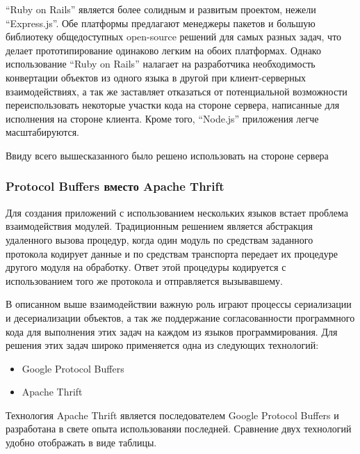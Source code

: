 \documentclass[14pt, a4paper]{extarticle}
\begin{document}
``Ruby on Rails'' является более солидным и развитым проектом, нежели
``Express.js''. Обе платформы предлагают менеджеры пакетов и большую библиотеку
общедоступных open-source решений для самых разных задач, что делает
прототипирование одинаково легким на обоих платформах. Однако использование
``Ruby on Rails'' налагает на разработчика необходимость конвертации объектов из
одного языка в другой при клиент-серверных взаимодействиях, а так же заставляет
отказаться от потенциальной возможности переиспользовать некоторые участки кода
на стороне сервера, написанные для исполнения на стороне клиента. Кроме того,
``Node.js'' приложения легче масштабируются.

Ввиду всего вышесказанного было решено использовать  на
стороне сервера

\subsubsection{Protocol Buffers вместо Apache Thrift}

Для создания приложений с использованием нескольких языков встает проблема
взаимодействия модулей. Традиционным решением является абстракция удаленного
вызова процедур, когда один модуль по средствам заданного протокола кодирует
данные и по средствам транспорта передает их процедуре другого модуля на
обработку. Ответ этой процедуры
кодируется с использованием того же протокола и отправляется вызывавшему.

В описанном выше взаимодействии важную роль играют процессы сериализации и
десериализации
объектов, а так же поддержание согласованности программного кода для выполнения
этих задач на каждом из языков программирования. Для решения этих задач широко
применяется одна из следующих технологий:

\begin{itemize}
    \item Google Protocol Buffers
    \item Apache Thrift
\end{itemize}

Технология Apache Thrift является последователем Google
Protocol Buffers и разработана в свете опыта использованяи последней. Сравнение
двух технологий удобно отображать в виде таблицы.

\begin{center}
\end{center}
\end{document}
